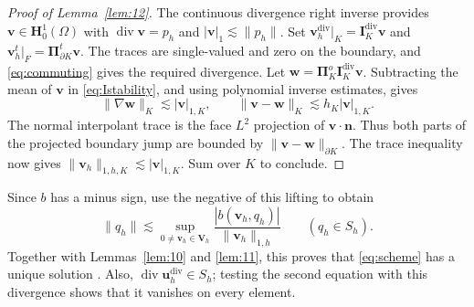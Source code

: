 \documentclass[review,hidelinks,onefignum,onetabnum]{siamart251216}
\newcommand{\AI}[1]{{\color{blue}#1}}
\begin{document}
\AI{\begin{proof}[Proof of Lemma~\ref{lem:12}]
The continuous divergence right inverse \cite{BBF2013} provides
$\boldsymbol v\in\boldsymbol H_0^1(\Omega)$ with
$\operatorname{div}\boldsymbol v=p_h$ and
$|\boldsymbol v|_1\lesssim\|p_h\|$.
Set $\boldsymbol v_h^{\operatorname{div}}|_K=
\boldsymbol I_K^{\operatorname{div}}\boldsymbol v$ and
$\boldsymbol v_h^t|_F=\boldsymbol\Pi_{\partial K}^t\boldsymbol v$.
The traces are single-valued and zero on the boundary, and
\eqref{eq:commuting} gives the required divergence.
Let $\boldsymbol w=\boldsymbol\Pi_K^o\boldsymbol I_K^{\operatorname{div}}\boldsymbol v$.
Subtracting the mean of $\boldsymbol v$ in \eqref{eq:Istability}, and using
polynomial inverse estimates, gives
\[
\|\nabla\boldsymbol w\|_K\lesssim|\boldsymbol v|_{1,K},
\qquad
\|\boldsymbol v-\boldsymbol w\|_K\lesssim h_K|\boldsymbol v|_{1,K}.
\]
The normal interpolant trace is the face $L^2$ projection of
$\boldsymbol v\cdot\boldsymbol n$. Thus both parts of the projected boundary
jump are bounded by $\|\boldsymbol v-\boldsymbol w\|_{\partial K}$.
The trace inequality now gives
$\|\boldsymbol v_h\|_{1,h,K}\lesssim|\boldsymbol v|_{1,K}$.
Sum over $K$ to conclude.
\end{proof}
Since $b$ has a minus sign, use the negative of this lifting to obtain
\begin{equation}\label{eq:pressure-infsup}
\|q_h\|\lesssim\sup_{0\ne\boldsymbol v_h\in\boldsymbol V_h}
\frac{|b(\boldsymbol v_h,q_h)|}{\|\boldsymbol v_h\|_{1,h}}
\qquad(q_h\in S_h).
\end{equation}
Together with Lemmas~\ref{lem:10} and \ref{lem:11}, this proves that
\eqref{eq:scheme} has a unique solution \cite{BBF2013}.
Also, $\operatorname{div}\boldsymbol u_h^{\operatorname{div}}\in S_h$;
testing the second equation with this divergence shows that it vanishes
on every element.}
\end{document}
